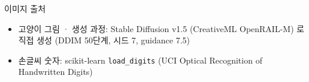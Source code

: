 \documentclass[aspectratio=169,11pt]{beamer}
\begin{document}
\begin{frame}{이미지 출처}
\vfill
\begin{itemize}
\item 고양이 그림 · 생성 과정: Stable Diffusion v1.5 (CreativeML OpenRAIL-M) 로 직접 생성 (DDIM 50단계, 시드 7, guidance 7.5)
\item 손글씨 숫자: scikit-learn \texttt{load\_digits} (UCI Optical Recognition of Handwritten Digits)
\end{itemize}
\vfill
\end{frame}
\end{document}

